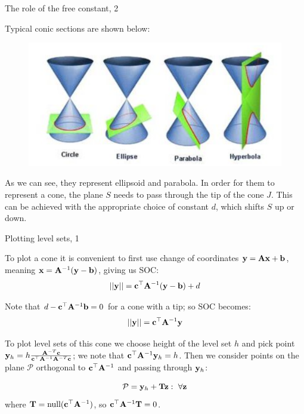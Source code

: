 \documentclass{beamer}
\begin{document}
\begin{frame}{The role of the free constant, 2}
	\begin{flushleft}
		
		Typical conic sections are shown below:
		
		\begin{figure}
			\centering
			\includegraphics[width=0.7\linewidth]{cones}
			\label{fig:cones}
		\end{figure}
	
		As we can see, they represent ellipsoid and parabola. In order for them to represent a cone, the plane  $S$ needs to pass through the tip of the cone $J$. This can be achieved with the appropriate choice of constant $d$, which shifts $S$ up or down.
		
	\end{flushleft}
\end{frame}



\begin{frame}{Plotting level sets, 1}
	\begin{flushleft}
		
		To plot a cone it is convenient to first use change of coordinates $\mathbf{y} = \mathbf{A}\mathbf{x}+\mathbf{b}$, meaning $\mathbf{x} =\mathbf{A}^{-1} (\mathbf{y} - \mathbf{b})$, giving us SOC:
		\begin{equation}
			||\mathbf{y}|| = \mathbf{c}^\top \mathbf{A}^{-1} (\mathbf{y} - \mathbf{b}) + d
		\end{equation}
		
		Note that $d - \mathbf{c}^\top \mathbf{A}^{-1}\mathbf{b} = 0$ for a cone with a tip; so SOC becomes:
		\begin{equation}
			||\mathbf{y}|| = \mathbf{c}^\top \mathbf{A}^{-1} \mathbf{y}
		\end{equation}
		
		To plot level sets of this cone we choose height of the level set $h$ and pick point $\mathbf{y}_h = h \frac{\mathbf{A}^{-T} \mathbf{c}}{\mathbf{c}^\top \mathbf{A}^{-1}\mathbf{A}^{-T} \mathbf{c}}$; we note that $\mathbf{c}^\top \mathbf{A}^{-1} \mathbf{y}_h = h$. Then we consider points on the plane $\mathcal P$ orthogonal to $\mathbf{c}^\top \mathbf{A}^{-1}$ and passing through $\mathbf{y}_h$:
		
		\begin{equation}
			\mathcal P = {\mathbf{y}_h + \mathbf{T}\mathbf{z}: \  \forall \mathbf{z}}
		\end{equation}
		 where $\mathbf{T} = \text{null}(\mathbf{c}^\top \mathbf{A}^{-1})$, so $\mathbf{c}^\top \mathbf{A}^{-1} \mathbf{T} = 0$.

	\end{flushleft}
\end{frame}
\end{document}

